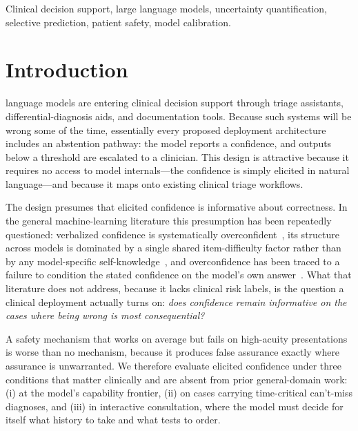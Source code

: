 \documentclass[journal,twoside]{IEEEtran}
\begin{document}
\begin{IEEEkeywords}
Clinical decision support, large language models, uncertainty quantification, selective prediction,
patient safety, model calibration.
\end{IEEEkeywords}

\section{Introduction}
 language models are entering clinical decision support through triage
assistants, differential-diagnosis aids, and documentation tools. Because such systems will be wrong
some of the time, essentially every proposed deployment architecture includes an abstention
pathway: the model reports a confidence, and outputs below a threshold are escalated to a
clinician. This design is attractive because it requires no access to model internals---the
confidence is simply elicited in natural language---and because it maps onto existing clinical
triage workflows.

The design presumes that elicited confidence is informative about correctness. In the general
machine-learning literature this presumption has been repeatedly questioned: verbalized confidence
is systematically overconfident~\cite{xiong2023,kadavath2022}, its structure across models is
dominated by a single shared item-difficulty factor rather than by any model-specific
self-knowledge~\cite{metacog2026}, and overconfidence has been traced to a failure to condition the
stated confidence on the model's own answer~\cite{advice2025}. What that literature does not
address, because it lacks clinical risk labels, is the question a clinical deployment actually turns
on: \emph{does confidence remain informative on the cases where being wrong is most consequential?}

A safety mechanism that works on average but fails on high-acuity presentations is worse than no
mechanism, because it produces false assurance exactly where assurance is unwarranted. We therefore
evaluate elicited confidence under three conditions that matter clinically and are absent from prior
general-domain work: (i) at the model's capability frontier, (ii) on cases carrying time-critical
can't-miss diagnoses, and (iii) in interactive consultation, where the model must decide for itself
what history to take and what tests to order.
\end{document}
